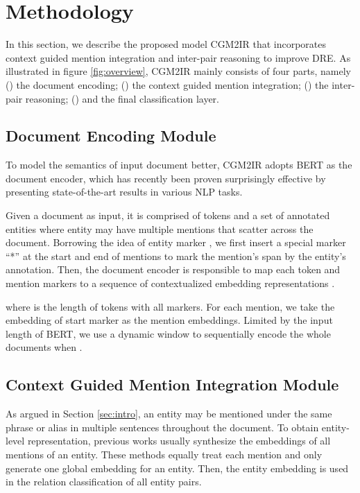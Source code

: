 \documentclass[11pt]{article}
\begin{document}
\section{Methodology}
In this section, we describe the proposed model CGM2IR that incorporates context guided mention integration and inter-pair reasoning to improve DRE.
As illustrated in figure \ref{fig:overview}, CGM2IR mainly consists of four parts, namely () the document encoding; () the context guided mention integration; () the inter-pair reasoning; () and the final classification layer.


\subsection{Document Encoding Module}

To model the semantics of input document better, CGM2IR adopts BERT \cite{devlin-etal-2019-bert} as the document encoder, which has recently been proven surprisingly effective by presenting state-of-the-art results in various NLP tasks.

Given a document  as input, it is comprised of  tokens   and a set of annotated entities  where entity  may have multiple mentions that scatter across the document.
Borrowing the idea of entity marker \citep{baldini-soares-etal-2019-matching}, we first insert a special marker ``*'' at the start and end of mentions to mark the mention's span by the entity's annotation.
Then, the document encoder is responsible to map each token and mention markers to a sequence of contextualized embedding representations .

where  is the length of tokens with all markers.
For each mention, we take the embedding of start marker as the mention embeddings. 
Limited by the input length of BERT, we use a dynamic window \citep{DBLP:conf/aaai/Zhou0M021} to sequentially encode the whole documents when .


\subsection{Context Guided Mention Integration Module}
\label{sec:context}
As argued in Section \ref{sec:intro}, an entity may be mentioned under the same phrase or alias in multiple sentences throughout the document.
To obtain entity-level representation, previous works usually synthesize the embeddings of all mentions of an entity.
These methods equally treat each mention and only generate one global embedding for an entity.
Then, the entity embedding is used in the relation classification of all entity pairs.
\end{document}
